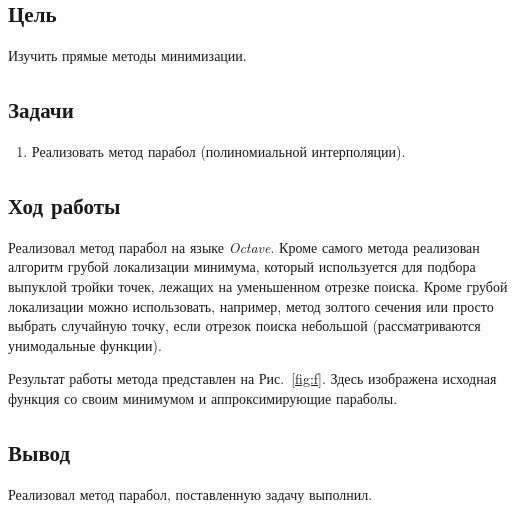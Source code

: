 



\newcommand{\labn}{3}


\subsection*{Цель}

Изучить прямые методы минимизации.

\subsection*{Задачи}

\begin{enumerate}
    \item Реализовать метод парабол (полиномиальной интерполяции).
\end{enumerate}

\subsection*{Ход работы}

Реализовал метод парабол на языке \textit{Octave}. Кроме самого метода
реализован алгоритм грубой локализации минимума, который используется для подбора выпуклой тройки точек, лежащих на 
уменьшенном отрезке поиска. Кроме грубой локализации можно использовать, например, метод золтого сечения или просто выбрать случайную точку, если
отрезок поиска небольшой (рассматриваются унимодальные функции).

Результат работы метода представлен на Рис.~\ref{fig:f}.
Здесь изображена исходная функция со своим минимумом и аппроксимирующие параболы.

\subsection*{Вывод}

Реализовал метод парабол, поставленную задачу выполнил.


